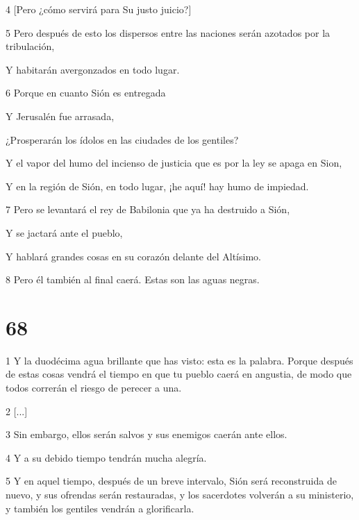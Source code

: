 \par 4 [Pero ¿cómo servirá para Su justo juicio?]

\par 5 Pero después de esto los dispersos entre las naciones serán azotados por la tribulación,

Y habitarán avergonzados en todo lugar.

\par 6 Porque en cuanto Sión es entregada

Y Jerusalén fue arrasada,

¿Prosperarán los ídolos en las ciudades de los gentiles?

Y el vapor del humo del incienso de justicia que es por la ley se apaga en Sion,

\par Y en la región de Sión, en todo lugar, ¡he aquí! hay humo de impiedad.

\par 7 Pero se levantará el rey de Babilonia que ya ha destruido a Sión,

Y se jactará ante el pueblo,

Y hablará grandes cosas en su corazón delante del Altísimo.

\par 8 Pero él también al final caerá. Estas son las aguas negras.

\chapter{68}

\par 1 Y la duodécima agua brillante que has visto: esta es la palabra. Porque después de estas cosas vendrá el tiempo en que tu pueblo caerá en angustia, de modo que todos correrán el riesgo de perecer a una.

\par 2 [...]

\par 3 Sin embargo, ellos serán salvos y sus enemigos caerán ante ellos.

\par 4 Y a su debido tiempo tendrán mucha alegría.

\par 5 Y en aquel tiempo, después de un breve intervalo, Sión será reconstruida de nuevo, y sus ofrendas serán restauradas, y los sacerdotes volverán a su ministerio, y también los gentiles vendrán a glorificarla.

